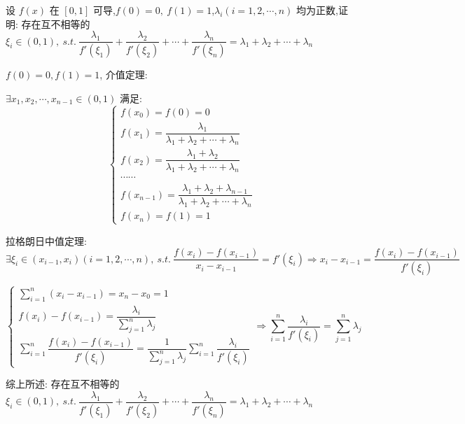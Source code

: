 \begin{proposition}\label{pro: $n$中值问题}
	设 $f(x)$ 在 $[0,1]$ 可导,$f(0)=0,\ f(1)=1$,$\lambda_{i}(i=1,2,\cdots,n)$ 均为正数,证明: 
	存在互不相等的 $\xi_{i}\in(0,1),\ s.t.\ \dfrac{\lambda_{1}}{f'(\xi_{1})}+\dfrac{\lambda_{2}}{f'(\xi_{2})}+\cdots+\dfrac{\lambda_{n}}{f'(\xi_{n})}=\lambda_{1}+\lambda_{2}+\cdots+\lambda_{n}$
\end{proposition}
\begin{solution}

	$f(0)=0,f(1)=1$, 介值定理:

	$\exists x_{1},x_{2},\cdots,x_{n-1}\in(0,1)$ 满足:
	$$\begin{cases}
		f(x_{0}) = f(0) = 0\\
		f(x_{1})=\dfrac{\lambda_{1}}{\lambda_{1}+\lambda_{2}+\cdots+\lambda_{n}}             \\
		f(x_{2})=\dfrac{\lambda_{1}+\lambda_{2}}{\lambda_{1}+\lambda_{2}+\cdots+\lambda_{n}} \\
		\cdots\cdots                                                                         \\
		f(x_{n-1})=\dfrac{\lambda_{1}+\lambda_{2}+\lambda_{n-1}}{\lambda_{1}+\lambda_{2}+\cdots+\lambda_{n}}\\
		f(x_{n}) = f(1) = 1
	\end{cases}$$

	拉格朗日中值定理:
	$$\exists \xi_{i}\in(x_{i-1},x_{i})(i=1,2,\cdots,n),\ s.t.\ \dfrac{f(x_{i})-f(x_{i-1})}{x_{i}-x_{i-1}} = f'(\xi_{i})\Rightarrow x_{i} - x_{i-1} = \dfrac{f(x_{i})-f(x_{i-1})}{f'(\xi_{i})}$$
	
	$$\begin{cases}
		\sum\limits_{i=1}^{n}(x_{i}-x_{i-1}) = x_{n}-x_{0} =1\\
		f(x_{i})-f(x_{i-1})= \dfrac{\lambda_{i}}{\sum\limits_{j=1}^{n}\lambda_{j}}\\
		\sum\limits_{i=1}^{n}\dfrac{f(x_{i})-f(x_{i-1})}{f'(\xi_{i})} = \dfrac{1}{\sum\limits_{j=1}^{n}\lambda_{j}}\sum\limits_{i=1}^{n}\dfrac{\lambda_{i}}{f'(\xi_{i})}
	\end{cases}\Rightarrow
	\sum\limits_{i=1}^{n}\dfrac{\lambda_{i}}{f'(\xi_{i})} = \sum\limits_{j=1}^{n}\lambda_{j}
	$$

	综上所述: 存在互不相等的 $\xi_{i}\in(0,1),\ s.t.\ \dfrac{\lambda_{1}}{f'(\xi_{1})}+\dfrac{\lambda_{2}}{f'(\xi_{2})}+\cdots+\dfrac{\lambda_{n}}{f'(\xi_{n})}=\lambda_{1}+\lambda_{2}+\cdots+\lambda_{n}$
\end{solution}


